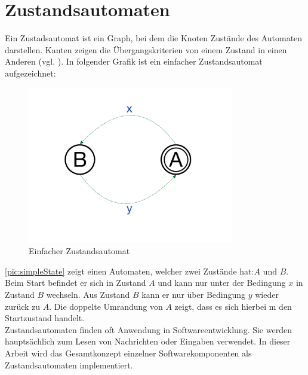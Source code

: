\section{Zustandsautomaten}
Ein Zustadsautomat ist ein Graph, bei dem die Knoten Zustände des Automaten darstellen. Kanten zeigen die Übergangskriterien von einem Zustand in einen Anderen (vgl. \cite{infoSkript}). In folgender Grafik ist ein einfacher Zustandsautomat aufgezeichnet: 

\begin{figure}[h]
	\begin{center}
		\includegraphics[width=9cm]{simpleState.pdf}
		\caption{\label{pic:simpleState}Einfacher Zustandsautomat}
	\end{center}
\end{figure}

\autoref{pic:simpleState} zeigt einen Automaten, welcher zwei Zustände hat:$A$ und $B$. Beim Start befindet er sich in Zustand $A$ und kann nur unter der Bedingung $x$ in Zustand $B$ wechseln. Aus Zustand $B$ kann er nur über Bedingung $y$ wieder zurück zu $A$. Die doppelte Umrandung von $A$ zeigt, dass es sich hierbei m den Startzustand handelt. \\
Zustandsautomaten finden oft Anwendung in Softwareentwicklung. Sie werden hauptsächlich zum Lesen von Nachrichten oder Eingaben verwendet. In dieser Arbeit wird das Gesamtkonzept einzelner Softwarekomponenten als Zustandsautomaten implementiert.